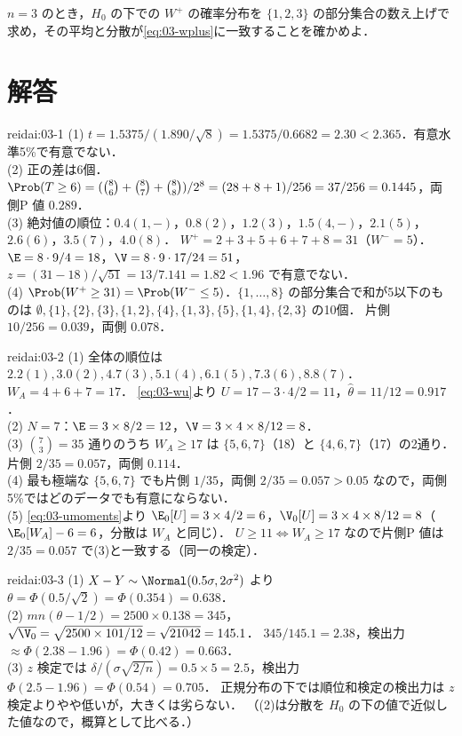 \begin{reidai}\label{reidai:03-4}
$n=3$ のとき，$H_0$ の下での $W^+$ の確率分布を $\{1,2,3\}$ の部分集合の数え上げで求め，その平均と分散が\cref{eq:03-wplus}に一致することを確かめよ．
\end{reidai}

\section{解答}\label{sec:03-sol}
\begin{kaitou}{reidai:03-1}
(1) $t=1.5375/(1.890/\sqrt8)=1.5375/0.6682=2.30<2.365$．有意水準5\%で有意でない．\\
(2) 正の差は6個．$\Prob(T\ge6)=(\binom86+\binom87+\binom88)/2^8=(28+8+1)/256=37/256=0.1445$，両側P 値 $0.289$．\\
(3) 絶対値の順位：$0.4(1,-)$，$0.8(2)$，$1.2(3)$，$1.5(4,-)$，$2.1(5)$，$2.6(6)$，$3.5(7)$，$4.0(8)$．
$W^+=2+3+5+6+7+8=31$（$W^-=5$）．$\E=8\cdot9/4=18$，$\V=8\cdot9\cdot17/24=51$，
$z=(31-18)/\sqrt{51}=13/7.141=1.82<1.96$ で有意でない．\\
(4) $\Prob(W^+\ge31)=\Prob(W^-\le5)$．$\{1,\dots,8\}$ の部分集合で和が5以下のものは
$\emptyset,\{1\},\{2\},\{3\},\{1,2\},\{4\},\{1,3\},\{5\},\{1,4\},\{2,3\}$ の10個．
片側 $10/256=0.039$，両側 $0.078$．
\end{kaitou}

\begin{kaitou}{reidai:03-2}
(1) 全体の順位は $2.2(1),3.0(2),4.7(3),5.1(4),6.1(5),7.3(6),8.8(7)$．$W_A=4+6+7=17$．
\cref{eq:03-wu}より $U=17-3\cdot4/2=11$，$\hat\theta=11/12=0.917$．\\
(2) $N=7$：$\E=3\times8/2=12$，$\V=3\times4\times8/12=8$．\\
(3) $\binom73=35$ 通りのうち $W_A\ge17$ は $\{5,6,7\}$（18）と $\{4,6,7\}$（17）の2通り．片側 $2/35=0.057$，両側 $0.114$．\\
(4) 最も極端な $\{5,6,7\}$ でも片側 $1/35$，両側 $2/35=0.057>0.05$ なので，両側5\%ではどのデータでも有意にならない．\\
(5) \cref{eq:03-umoments}より $\E_0[U]=3\times4/2=6$，$\V_0[U]=3\times4\times8/12=8$（$\E_0[W_A]-6=6$，分散は $W_A$ と同じ）．
$U\ge11\iff W_A\ge17$ なので片側P 値は $2/35=0.057$ で(3)と一致する（同一の検定）．
\end{kaitou}

\begin{kaitou}{reidai:03-3}
(1) $X-Y\sim\Normal(0.5\sigma,2\sigma^2)$ より $\theta=\Phi(0.5/\sqrt2)=\Phi(0.354)=0.638$．\\
(2) $mn(\theta-1/2)=2500\times0.138=345$，$\sqrt{\V_0}=\sqrt{2500\times101/12}=\sqrt{21042}=145.1$．
$345/145.1=2.38$，検出力 $\approx\Phi(2.38-1.96)=\Phi(0.42)=0.663$．\\
(3) $z$ 検定では $\delta/(\sigma\sqrt{2/n})=0.5\times5=2.5$，検出力 $\Phi(2.5-1.96)=\Phi(0.54)=0.705$．
正規分布の下では順位和検定の検出力は $z$ 検定よりやや低いが，大きくは劣らない．
（(2)は分散を $H_0$ の下の値で近似した値なので，概算として比べる．）
\end{kaitou}

